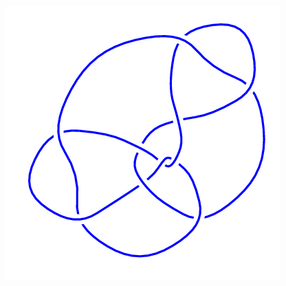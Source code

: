 \begin{figure}[H]
\begin{minipage}[b]{.18\linewidth}
	\end{minipage}
	\begin{minipage}[b]{.18\linewidth}
		\centering
		\includegraphics[width=\linewidth]{../data/10_146.png}
	\end{minipage}
\end{figure}
